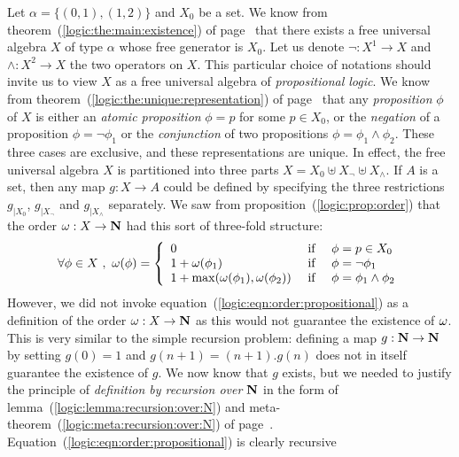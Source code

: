 Let $\alpha=\{(0,1),(1,2)\}$ and $X_{0}$ be a set. We know from
theorem~(\ref{logic:the:main:existence}) of
page~\pageref{logic:the:main:existence} that there exists a free
universal algebra $X$ of type $\alpha$ whose free generator is
$X_{0}$. Let us denote $\lnot:X^{1}\to X$ and $\land:X^{2}\to X$ the
two operators on $X$. This particular choice of notations should
invite us to view $X$ as a free universal algebra of {\em
propositional logic}. We know from
theorem~(\ref{logic:the:unique:representation}) of
page~\pageref{logic:the:unique:representation} that any {\em
proposition} $\phi$ of $X$  is either an {\em atomic proposition}
$\phi=p$ for some $p\in X_{0}$, or the {\em negation} of a
proposition $\phi=\lnot \phi_{1}$ or the {\em conjunction} of two
propositions $\phi=\phi_{1}\land\phi_{2}$. These three cases are
exclusive, and these representations are unique. In effect, the free
universal algebra $X$ is partitioned into three parts $X=X_{0}\uplus
X_{\lnot}\uplus X_{\land}$. If $A$ is a set, then any map $g:X\to A$
could be defined by specifying the three restrictions $g_{|X_{0}}$,
$g_{|X_{\lnot}}$ and $g_{|X_{\land}}$ separately. We saw from
proposition~(\ref{logic:prop:order}) that the order $\mbox{$\omega$}:X\to\mbox{$\bf N$}$ had
this sort of three-fold structure:
    \begin{equation}\label{logic:eqn:order:propositional}
    \forall\phi\in X\ ,\ \om(\phi)=\left\{
                    \begin{array}{lcl}
                    0&\mbox{\ if\ }&\phi=p\in X_{0}\\
                    1+\om(\phi_{1})&\mbox{\ if\ }&\phi=\lnot\phi_{1}\\
                    1+\max(\om(\phi_{1}),\om(\phi_{2}))&\mbox{\ if\ }&\phi=\phi_{1}\land\phi_{2}
                    \end{array}\right.
    \end{equation}
However, we did not invoke
equation~(\ref{logic:eqn:order:propositional}) as a definition of
the order $\mbox{$\omega$}:X\to\mbox{$\bf N$}$ as this would not guarantee the existence of
$\mbox{$\omega$}$. This is very similar to the simple recursion problem:
defining a map $g:\mbox{$\bf N$}\to\mbox{$\bf N$}$ by setting $g(0)=1$ and
$g(n+1)=(n+1).g(n)$ does not in itself guarantee the existence of
$g$. We now know that $g$ exists, but we needed to justify the
principle of {\em definition by recursion over $\mbox{$\bf N$}$} in the form of
lemma~(\ref{logic:lemma:recursion:over:N}) and
meta-theorem~(\ref{logic:meta:recursion:over:N}) of
page~\pageref{logic:meta:recursion:over:N}.
Equation~(\ref{logic:eqn:order:propositional}) is clearly recursive
